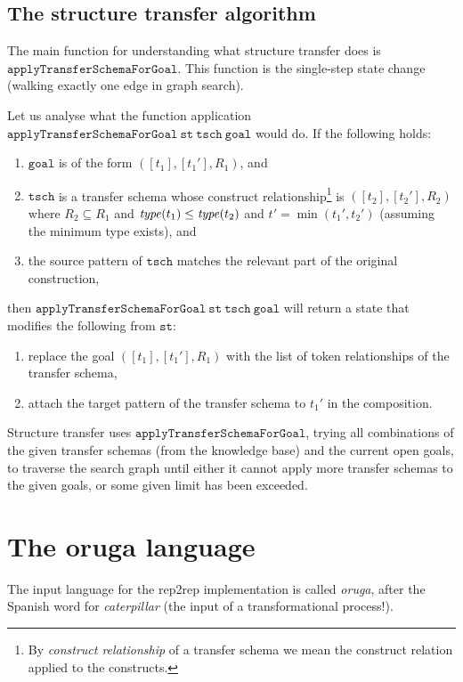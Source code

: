 \documentclass[a4paper]{article}
\theoremstyle{definition}
\begin{document}
	\subsection{The structure transfer algorithm}
	The main function for understanding what structure transfer does is $\mathtt{applyTransferSchemaForGoal}$. This function is the single-step state change (walking exactly one edge in graph search).

	Let us analyse what the function application $\mathtt{applyTransferSchemaForGoal\ st\ tsch\ goal}$ would do.
	If the following holds:
	\begin{enumerate}[itemsep=1pt]
		\item $\mathtt{goal}$ is of the form $([t_1],[t_1'],R_1)$, and
		\item $\mathtt{tsch}$ is a transfer schema whose construct relationship\footnote{By \textit{construct relationship} of a transfer schema we mean the construct relation applied to the constructs.} is $([t_2],[t_2'],R_2)$ where $R_2 \subseteq R_1$ and $\mathit{type}{(t_1)} \leq \mathit{type}{(t_2)}$ and $t'=\min(t_1',t_2')$ (assuming the minimum type exists), and
		\item the source pattern of $\mathtt{tsch}$ matches the relevant part of the original construction,
	\end{enumerate}
	then $\mathtt{applyTransferSchemaForGoal\ st\ tsch\ goal}$ will return a state that modifies the following from $\mathtt{st}$:
	\begin{enumerate}[itemsep=1pt]
		\item replace the goal $([t_1],[t_1'],R_1)$ with the list of token relationships of the transfer schema,
		\item attach the target pattern of the transfer schema to $t_1'$ in the composition.
	\end{enumerate}

	Structure transfer uses $\mathtt{applyTransferSchemaForGoal}$, trying all combinations of the given transfer schemas (from the knowledge base) and the current open goals, to traverse the search graph until either it cannot apply more transfer schemas to the given goals, or some given limit has been exceeded.

	\section{The oruga language}
	The input language for the rep2rep implementation is called \textit{oruga}, after the Spanish word for \textit{caterpillar} (the input of a transformational process!).
\end{document}
